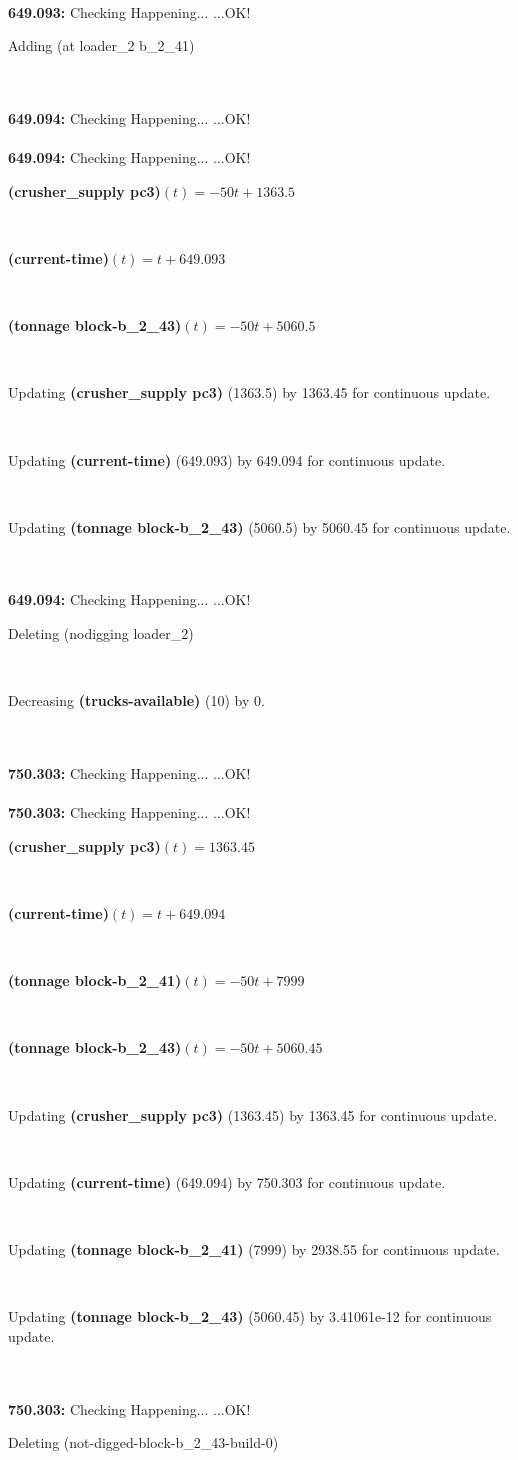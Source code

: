 \documentclass[a4paper,12pt]{article}
\newcommand{\atime}[1]{{\bf #1:}}
\newcommand{\exprn}[1]{{\sf #1}}
\newcommand{\fexprn}[1]{{\small {\bf #1}}}
\newcommand{\checkhappening}{Checking Happening... }
\newcommand{\listrow}[1]{\begin{minipage}[t]{11.5cm} #1 \end{minipage}}
\newcommand{\happeningOK}{...OK!}
\newcommand{\assignmentcts}[3]{\listrow{Updating \fexprn{#1} (#2) by #3 for continuous update.}}
\newcommand{\decrease}[3]{\listrow{Decreasing \fexprn{#1} (#2) by #3.}}
\newcommand{\function}[2]{\listrow{\fexprn{#1}$(t) = #2$}}
\newcommand{\adding}[1]{\listrow{Adding \exprn{#1} }}
\newcommand{\deleting}[1]{\listrow{Deleting \exprn{#1} }}
\begin{document}
\begin{tabbing}
\\
\atime{649.093} \> \checkhappening\happeningOK\\
 \> \adding{(at loader\_2 b\_2\_41)}\\
\\
\atime{649.094} \> \checkhappening\happeningOK\\
\\
\atime{649.094} \> \checkhappening\happeningOK\\
 \> \function{(crusher\_supply pc3)}{ - 50t + 1363.5}\\
 \> \function{(current-time)}{t + 649.093}\\
 \> \function{(tonnage block-b\_2\_43)}{ - 50t + 5060.5}\\
 \> \assignmentcts{(crusher\_supply pc3)}{1363.5}{1363.45}\\
 \> \assignmentcts{(current-time)}{649.093}{649.094}\\
 \> \assignmentcts{(tonnage block-b\_2\_43)}{5060.5}{5060.45}\\
\\
\atime{649.094} \> \checkhappening\happeningOK\\
 \> \deleting{(nodigging loader\_2)}\\
 \> \decrease{(trucks-available)}{10}{0}\\
\\
\atime{750.303} \> \checkhappening\happeningOK\\
\\
\atime{750.303} \> \checkhappening\happeningOK\\
 \> \function{(crusher\_supply pc3)}{1363.45}\\
 \> \function{(current-time)}{t + 649.094}\\
 \> \function{(tonnage block-b\_2\_41)}{ - 50t + 7999}\\
 \> \function{(tonnage block-b\_2\_43)}{ - 50t + 5060.45}\\
 \> \assignmentcts{(crusher\_supply pc3)}{1363.45}{1363.45}\\
 \> \assignmentcts{(current-time)}{649.094}{750.303}\\
 \> \assignmentcts{(tonnage block-b\_2\_41)}{7999}{2938.55}\\
 \> \assignmentcts{(tonnage block-b\_2\_43)}{5060.45}{3.41061e-12}\\
\\
\atime{750.303} \> \checkhappening\happeningOK\\
 \> \deleting{(not-digged-block-b\_2\_43-build-0)}\\

\end{tabbing}
\end{document}
